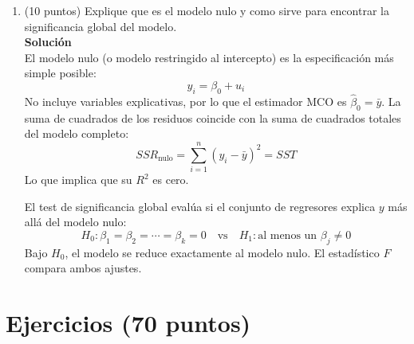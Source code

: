 \documentclass[10pt,a4paper]{article}
\begin{document}
\begin{enumerate}
Bajo el supuesto 6 de normalidad, los estimadores MCO tienen distribución normal exacta en muestras finitas, y por lo tanto los estadísticos
t y
F siguen exactamente las distribuciones de Student y Fisher, respectivamente. Esto permite inferencia válida incluso con muestras pequeñas.
En cambio, sin el supuesto de normalidad pero con muestra grande, la validez de la inferencia se sustenta en propiedades asintóticas: los estadísticos
t y
F siguen sus distribuciones de referencia solo de manera aproximada, y esta aproximación mejora a medida que n crece. Con muestras pequeñas y errores no normales, la inferencia podría ser inválida.
    
\item (10 puntos) Explique que es el modelo nulo y como sirve para encontrar la significancia global del modelo.
\\
\textbf{Solución}
\\
 El modelo nulo (o modelo restringido al intercepto) es la especificación más simple posible:
\[
y_i = \beta_0 + u_i
\]
No incluye variables explicativas, por lo que el estimador MCO es $\hat{\beta}_0 = \bar{y}$. La suma de cuadrados de los residuos coincide con la suma de cuadrados totales del modelo completo:
\[
SSR_{\text{nulo}} = \sum_{i=1}^{n}(y_i - \bar{y})^2 = SST
\]
Lo que implica que su $R^2$ es cero.

El test de significancia global evalúa si el conjunto de regresores explica $y$ más allá del modelo nulo:
\[
H_0: \beta_1 = \beta_2 = \cdots = \beta_k = 0 \quad \text{vs} \quad H_1: \text{al menos un } \beta_j \neq 0
\]
Bajo $H_0$, el modelo se reduce exactamente al modelo nulo. El estadístico $F$ compara ambos ajustes.


\end{enumerate}


\section{Ejercicios (70 puntos)}
\end{document}
